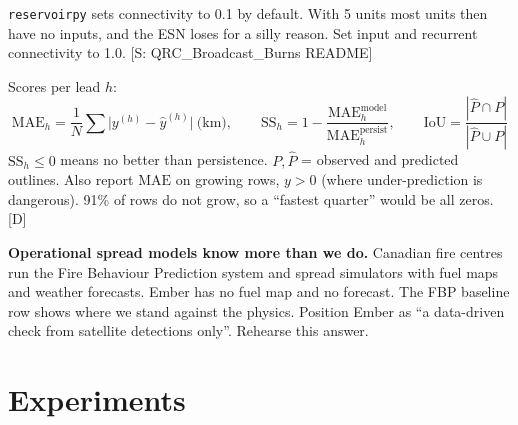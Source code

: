 \documentclass[11pt,a4paper]{article}
\newcommand{\tagbox}[2]{{\footnotesize\color{#1}\textsf{[#2]}}}
\newcommand{\supp}[1]{\tagbox{ForestGreen!70!black}{S: #1}}  %
\newcommand{\ours}{\tagbox{NavyBlue}{D}}                      %
\newcommand{\code}[1]{\texttt{\small #1}}
\begin{document}
\begin{watch}
\code{reservoirpy} sets connectivity to 0.1 by default. With 5 units most units then have no inputs, and the ESN loses
for a silly reason. Set input and recurrent connectivity to 1.0. \supp{QRC\_Broadcast\_Burns README}
\end{watch}

Scores per lead $h$:
\[
\mathrm{MAE}_h=\frac1N\sum\big|y^{(h)}-\hat y^{(h)}\big|\ \text{(km)},
\qquad
\mathrm{SS}_h=1-\frac{\mathrm{MAE}_h^{\text{model}}}{\mathrm{MAE}_h^{\text{persist}}},
\qquad
\mathrm{IoU}=\frac{|\hat P\cap P|}{|\hat P\cup P|}
\]
$\mathrm{SS}_h\le0$ means no better than persistence. $P,\hat P$ = observed and predicted outlines. Also report
$\mathrm{MAE}$ on growing rows, $y>0$ (where under-prediction is dangerous). 91\% of rows do not grow, so a ``fastest quarter'' would be all zeros. \ours

\begin{watch}
\textbf{Operational spread models know more than we do.} Canadian fire centres run the Fire Behaviour Prediction
system and spread simulators with fuel maps and weather forecasts. Ember has no fuel map and no forecast. The FBP
baseline row shows where we stand against the physics. Position Ember as ``a data-driven check from satellite
detections only''. Rehearse this answer.
\end{watch}

\section{Experiments}
\end{document}
